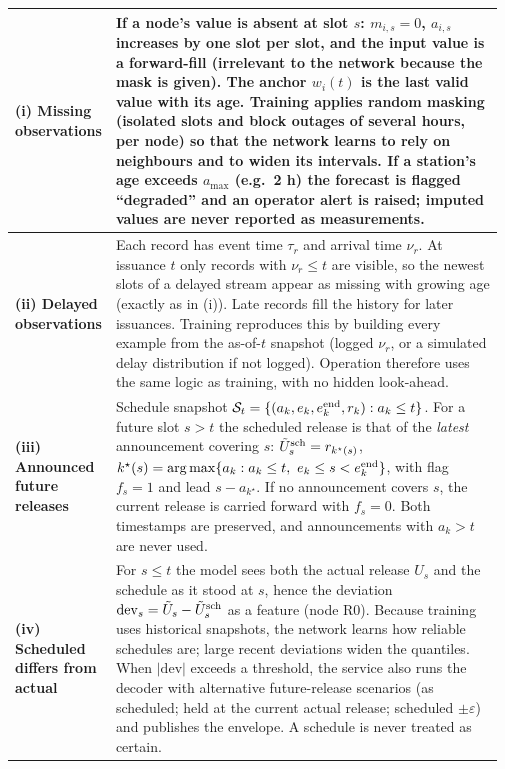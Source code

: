 \begin{longtable}{@{}p{0.17\linewidth}p{0.80\linewidth}@{}}
\toprule\endhead
\textbf{(i) Missing observations} & If a node's value is absent at slot $s$: $m_{i,s}=0$, $a_{i,s}$ increases by one slot per slot, and the input value is a forward-fill (irrelevant to the network because the mask is given). The anchor $w_i(t)$ is the last valid value with its age. Training applies random masking (isolated slots and block outages of several hours, per node) so that the network learns to rely on neighbours and to widen its intervals. If a station's age exceeds $a_{\max}$ (e.g.\ 2 h) the forecast is flagged ``degraded'' and an operator alert is raised; imputed values are never reported as measurements.\\ \midrule
\textbf{(ii) Delayed observations} & Each record has event time $\tau_r$ and arrival time $\nu_r$. At issuance $t$ only records with $\nu_r\le t$ are visible, so the newest slots of a delayed stream appear as missing with growing age (exactly as in (i)). Late records fill the history for later issuances. Training reproduces this by building every example from the as-of-$t$ snapshot (logged $\nu_r$, or a simulated delay distribution if not logged). Operation therefore uses the same logic as training, with no hidden look-ahead.\\ \midrule
\textbf{(iii) Announced future releases} & Schedule snapshot $\mathcal S_t=\{(a_k,e_k,e^{\rm end}_k,r_k):a_k\le t\}$. For a future slot $s>t$ the scheduled release is that of the \emph{latest} announcement covering $s$: $\tilde U^{\rm sch}_s=r_{k^\star(s)}$, $k^\star(s)=\arg\max\{a_k:a_k\le t,\ e_k\le s<e_k^{\rm end}\}$, with flag $f_s=1$ and lead $s-a_{k^\star}$. If no announcement covers $s$, the current release is carried forward with $f_s=0$. Both timestamps are preserved, and announcements with $a_k>t$ are never used.\\ \midrule
\textbf{(iv) Scheduled differs from actual} & For $s\le t$ the model sees both the actual release $U_s$ and the schedule as it stood at $s$, hence the deviation $\mathrm{dev}_s=\tilde U_s-\tilde U^{\rm sch}_s$ as a feature (node R0). Because training uses historical snapshots, the network learns how reliable schedules are; large recent deviations widen the quantiles. When $|\mathrm{dev}|$ exceeds a threshold, the service also runs the decoder with alternative future-release scenarios (as scheduled; held at the current actual release; scheduled $\pm\varepsilon$) and publishes the envelope. A schedule is never treated as certain.\\ \midrule

\end{longtable}
